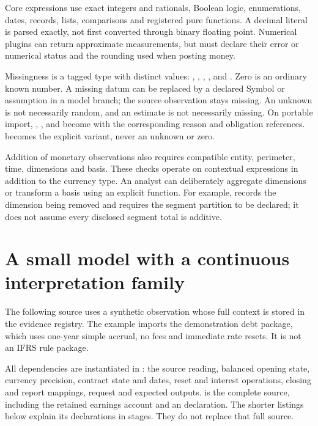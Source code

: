 Core expressions use exact integers and rationals, Boolean logic, enumerations,
dates, records, lists, comparisons and registered pure functions. A decimal
literal is parsed exactly, not first converted through binary floating point.
Numerical plugins can return approximate measurements, but must declare their
error or numerical status and the rounding used when posting money.

Missingness is a tagged type with distinct values: ,
, , , and
. Zero is an ordinary known number. A missing datum can
be replaced by a declared Symbol or assumption in a model branch; the source
observation stays missing. An unknown is not necessarily random, and an
estimate is not necessarily missing.
On portable import, , ,  and
 become  with the corresponding reason
and obligation references.  becomes the explicit
 variant, never an unknown or zero.

Addition of monetary observations also requires compatible entity, perimeter,
time, dimensions and basis. These checks operate on contextual expressions in
addition to the currency type. An analyst can deliberately aggregate dimensions
or transform a basis using an explicit function. For example,
 records the dimension being removed and requires
the segment partition to be declared; it does not assume every disclosed
segment total is additive.


\section{A small model with a continuous interpretation family}

The following source uses a synthetic observation whose full context is stored
in the evidence registry. The example imports the demonstration debt package,
which uses one-year simple accrual, no fees and immediate rate resets. It is
not an IFRS rule package.

All dependencies are instantiated in
: the source reading, balanced opening
state, currency precision, contract state and dates, reset and interest
operations, closing and report mappings, request and expected outputs.
 is the complete source, including the retained
earnings account and an  declaration. The shorter listings below
explain its declarations in stages. They do not replace that full source.

